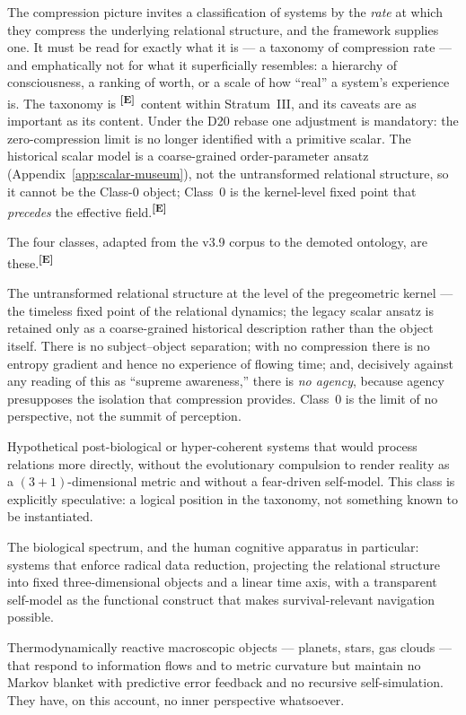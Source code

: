 \documentclass[12pt,a4paper,twoside]{article}
\theoremstyle{plain}
\theoremstyle{definition}
\theoremstyle{remark}
\newcommand{\catmark}[1]{\textsuperscript{\textsf{\textbf{[#1]}}}}
\begin{document}
The compression picture invites a classification of systems by the
\emph{rate} at which they compress the underlying relational structure, and
the framework supplies one. It must be read for exactly what it is --- a
taxonomy of compression rate --- and emphatically not for what it
superficially resembles: a hierarchy of consciousness, a ranking of worth,
or a scale of how ``real'' a system's experience is. The taxonomy is
\catmark{E}\ content within Stratum~III, and its caveats are as important
as its content. Under the D20 rebase one adjustment is mandatory:
the zero-compression limit is no longer identified with a primitive scalar.
The historical scalar model is a coarse-grained order-parameter ansatz (Appendix~\ref{app:scalar-museum}), not the
untransformed relational structure, so it cannot be the Class-0 object;
Class~0 is the kernel-level fixed point that \emph{precedes} the effective
field.\catmark{E}

The four classes, adapted from the v3.9 corpus to the demoted ontology, are
these.\catmark{E}

\begin{description}[leftmargin=1.4em,style=nextline]
\item[Class~0: Zero compression.] The untransformed relational structure at
the level of the pregeometric kernel --- the timeless fixed point of the
relational dynamics; the legacy scalar ansatz is retained only as a coarse-grained historical
description rather than the object itself. There is no subject--object
separation; with no compression there is no entropy gradient and hence no
experience of flowing time; and, decisively against any reading of this as
``supreme awareness,'' there is \emph{no agency}, because agency
presupposes the isolation that compression provides. Class~0 is the limit
of no perspective, not the summit of perception.
\item[Class~I: Weak compression.] Hypothetical post-biological or
hyper-coherent systems that would process relations more directly, without
the evolutionary compulsion to render reality as a $(3{+}1)$-dimensional
metric and without a fear-driven self-model. This class is explicitly
speculative: a logical position in the taxonomy, not something known to be
instantiated.
\item[Class~II: Strong compression.] The biological spectrum, and the human
cognitive apparatus in particular: systems that enforce radical data
reduction, projecting the relational structure into fixed three-dimensional
objects and a linear time axis, with a transparent self-model as the
functional construct that makes survival-relevant navigation possible.
\item[Class~III: Extreme compression.] Thermodynamically reactive
macroscopic objects --- planets, stars, gas clouds --- that respond to
information flows and to metric curvature but maintain no Markov blanket
with predictive error feedback and no recursive self-simulation. They have,
on this account, no inner perspective whatsoever.
\end{description}
\end{document}
